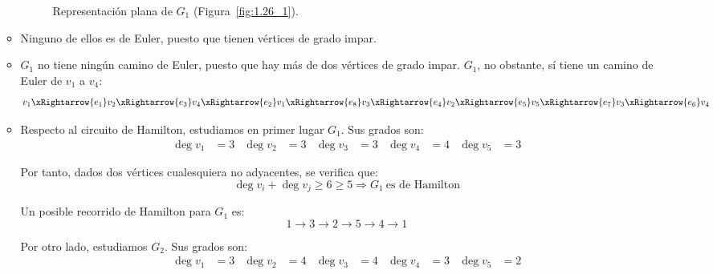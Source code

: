 \begin{ejercicio}
\begin{enumerate}
\begin{itemize}
\begin{figure}
                \caption{Representación plana de $G_1$ (Figura~\ref{fig:1.26_1}).}
                \label{fig:1.26_2}
            \end{figure}
            \item Ninguno de ellos es de Euler, puesto que tienen vértices de grado impar.
            \item $G_1$ no tiene ningún camino de Euler, puesto que hay más de dos vértices de grado impar. $G_1$, no obstante, sí tiene un camino de Euler de $v_1$ a $v_4$:
            \begin{equation*}
                v_1\xRightarrow{e_1}v_2
                \xRightarrow{e_3}v_4
                \xRightarrow{e_2}v_1
                \xRightarrow{e_8}v_3
                \xRightarrow{e_4}v_2
                \xRightarrow{e_5}v_5
                \xRightarrow{e_7}v_3
                \xRightarrow{e_6}v_4
            \end{equation*}
            \item Respecto al circuito de Hamilton, estudiamos en primer lugar $G_1$. Sus grados son:
            \begin{align*}
                \deg v_1 &= 3 & \deg v_2 &= 3 & \deg v_3 &= 3 & \deg v_4 &= 4 & \deg v_5 &= 3
            \end{align*}

            Por tanto, dados dos vértices cualesquiera no adyacentes, se verifica que:
            \begin{equation*}
                \deg v_i + \deg v_j \geq 6\geq 5\Longrightarrow G_1\ \text{es de Hamilton}
            \end{equation*}

            Un posible recorrido de Hamilton para $G_1$ es:
            \begin{equation*}
                1\to 3\to 2\to 5\to 4\to 1
            \end{equation*}

            Por otro lado, estudiamos $G_2$. Sus grados son:
            \begin{align*}
                \deg v_1 &= 3 & \deg v_2 &= 4 & \deg v_3 &= 4 & \deg v_4 &= 3 & \deg v_5 &= 2
            \end{align*}


\end{itemize}
\end{enumerate}
\end{ejercicio}
